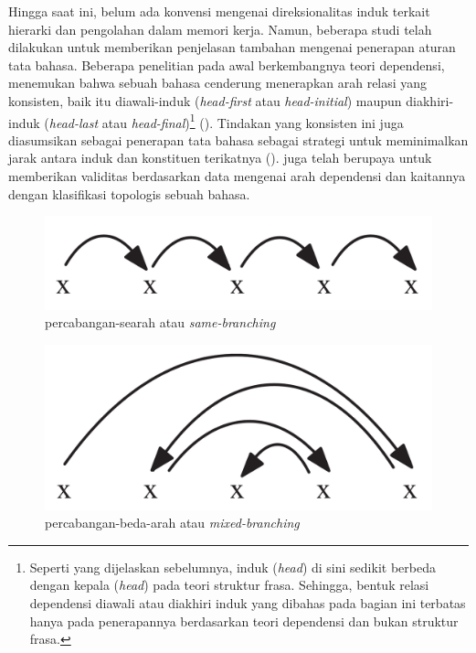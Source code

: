 Hingga saat ini, belum ada konvensi mengenai direksionalitas induk terkait hierarki dan pengolahan dalam memori kerja. Namun, beberapa studi telah dilakukan untuk memberikan penjelasan tambahan mengenai penerapan aturan tata bahasa. Beberapa penelitian pada awal berkembangnya teori dependensi, menemukan bahwa sebuah bahasa cenderung menerapkan arah relasi yang konsisten, baik itu \gls{diawali-induk} (\textit{head-first} atau \textit{head-initial}) maupun \gls{diakhiri-induk} (\textit{head-last} atau \textit{head-final})\footnote{Seperti yang dijelaskan sebelumnya, induk (\textit{head}) di sini sedikit berbeda dengan kepala (\textit{head}) pada teori struktur frasa. Sehingga, bentuk relasi dependensi diawali atau diakhiri induk yang dibahas pada bagian ini terbatas hanya pada penerapannya berdasarkan teori dependensi dan bukan struktur frasa.} (\citealp{hawkins1994performance, radford1997syntactic, vennemann1994linguistic}). Tindakan yang konsisten ini juga diasumsikan sebagai penerapan tata bahasa sebagai strategi untuk meminimalkan jarak antara induk dan konstituen terikatnya (\citealp{hawkins1994performance, frazier1985syntactic}). \cite{liu2010dependency} juga telah berupaya untuk memberikan validitas berdasarkan data mengenai arah dependensi dan kaitannya dengan klasifikasi topologis sebuah bahasa.

\begin{figure}
	\centering \includegraphics[width=0.5
	\textwidth] {pics/samebranching.png} \caption{\Gls{percabangan-searah} atau \textit{same-branching}} 
\label{fig:samebranching} \end{figure}

\begin{figure}
	\centering \includegraphics[width=0.5
	\textwidth] {pics/mixedbranching.png} \caption{\Gls{percabangan-beda-arah} atau \textit{mixed-branching}} 
\label{fig:mixedbranching} \end{figure}

